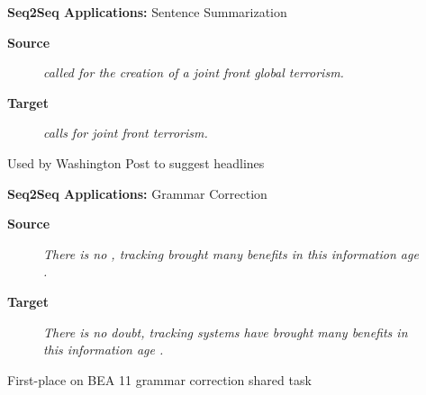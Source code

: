 \documentclass{beamer}
\let\tempone\itemize
\let\temptwo\enditemize
\renewenvironment{itemize}{\tempone\addtolength{\itemsep}{0.5\baselineskip}}{\temptwo}
\newcommand{\air}{\vspace{0.25cm}}
\newcommand{\mair}{\vspace{-0.25cm}}
\newcommand{\Cite}[1]{{\footnotesize \citep{#1}}}
\begin{document}
\begin{frame}
  \centerline{\textbf{Seq2Seq Applications:} \alert{Sentence Summarization} \Cite{Rush2015} }
  \begin{center}
    \textbf{Source}
  \end{center}
  
  \begin{figure}
    \textit{
      called  for the creation of
      a joint front  global terrorism. }
  \end{figure}

  \begin{center}
    \textbf{Target}
  \end{center}
  \mair

  \begin{figure}
    \centering
    \textit{ calls for joint
      front  terrorism.}
  \end{figure}

\air
\air

  \begin{itemize}
  \item Used by Washington Post to suggest headlines \Cite{shuguangwang}
  \end{itemize}
\end{frame}

\begin{frame}
  \centerline{\textbf{Seq2Seq Applications:} \alert{Grammar Correction} \Cite{Schmaltz2016} }
  
  \begin{center}
    \textbf{Source}
  \end{center}
  
  \begin{figure}
    \textit{There is no , tracking  brought many benefits in this information
age . }
  \end{figure}

  \begin{center}
    \textbf{Target}
  \end{center}
  \mair

  \begin{figure}
    \centering
    \textit{There is no doubt, tracking systems have
      brought many benefits in this information
      age . }
  \end{figure}

  \begin{itemize}
  \item First-place on BEA 11 grammar correction shared task \Cite{Daudaravicius2016}
  \end{itemize}
\end{frame}
\end{document}
